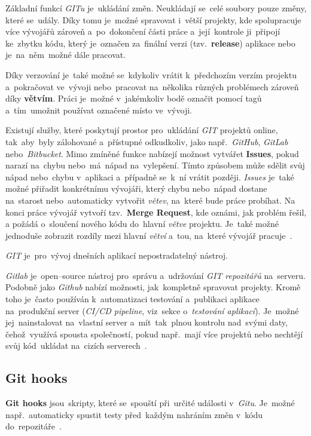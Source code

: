 \documentclass[11pt,a4paper]{report}
\begin{document}
            Základní funkcí \emph{GITu} je~ukládání změn. Neukládají se~celé soubory pouze změny, které se~udály. Díky tomu je~možné spravovat i~větší projekty, kde spolupracuje více vývojářů zároveň a~po~dokončení části práce a~její~kontrole ji~připojí ke~zbytku kódu, který je~označen za~finální verzi (tzv.~\textbf{release}) aplikace nebo je~na~něm~možné dále pracovat.
            
            Díky verzování je~také možné se~kdykoliv vrátit k~předchozím verzím projektu a~pokračovat ve~vývoji nebo~pracovat na~několika různých problémech zároveň díky \textbf{větvím}. Práci je~možné v~jakémkoliv bodě označit pomocí tagů a~tím~umožnit používat označené místo ve~vývoji.

            Existují služby, které poskytují prostor pro~ukládání \emph{GIT} projektů online, tak~aby~byly zálohované a~přístupné odkudkoliv, jako např.~\emph{GitHub}, \emph{GitLab} nebo~\emph{Bitbucket}. Mimo zmíněné funkce nabízejí možnost vytvářet \textbf{Issues}, pokud narazí na~chybu nebo~má~nápad na~vylepšení. Tímto způsobem může sdělit svůj nápad nebo~chybu v~aplikaci a~případně se~k~ní vrátit později. \emph{Issues} je~také možné přiřadit konkrétnímu vývojáři, který chybu nebo~nápad dostane na~starost nebo~automaticky vytvořit \emph{větev}, na~které bude práce probíhat. Na konci práce vývojář vytvoří tzv.~\textbf{Merge Request}, kde oznámi, jak problém řešil, a požádá o~sloučení nového kódu do~hlavní \emph{větve} projektu. Je~také možné jednoduše zobrazit rozdíly mezi hlavní \emph{větví} a~tou, na~které vývojář pracuje~\cite{gitscmBook}.
            
            \emph{GIT} je~pro~vývoj dnešních aplikací nepostradatelný nástroj.
            
            \emph{Gitlab} je~open--source nástroj pro~správu a~udržování \emph{GIT repozitářů} na~serveru. Podobně jako \emph{Github} nabízí možnosti, jak~kompletně spravovat projekty. Kromě toho je~často používán k~automatizaci testování a~publikaci aplikace na~produkční server (\emph{CI/CD pipeline}, viz~sekce o~\emph{testování aplikací}). Je~možné jej~nainstalovat na~vlastní server a~mít~tak~plnou kontrolu nad~svými daty, čehož~využívá spousta společností, pokud např.~mají více projektů nebo nechtějí svůj kód~ukládat na~cizích serverech~\cite{gitlab:panek2019optimalizace, gitlab:CICD, gitlab:actions}.

            \subsection{Git hooks}
                \textbf{Git hooks} jsou~skripty, které se~spouští při~určité události v~\emph{Gitu}. Je~možné např.~automaticky spustit testy před~každým nahráním změn v~kódu do~repozitáře~\cite{gitscmBook}.
\end{document}

